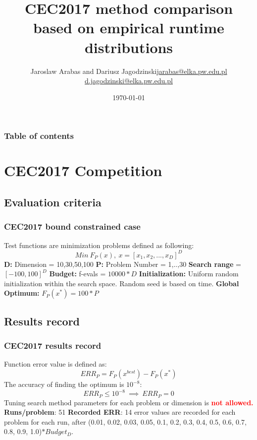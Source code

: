 \documentclass[hyperref={pdfpagelabels=false}]{beamer}
\title{CEC2017 method comparison based on empirical runtime distributions}
\author{Jaroslaw Arabas and Dariusz Jagodzinski\newline\url{jarabas@elka.pw.edu.pl}\newline
\url{d.jagodzinski@elka.pw.edu.pl}}
\date{\today}
\begin{document}
\begin{frame}
\titlepage
\end{frame} 


\begin{frame}
\frametitle{Table of contents}
\tableofcontents
\end{frame} 


\section{CEC2017 Competition} 
\subsection{Evaluation criteria}
\begin{frame}
\frametitle{CEC2017 bound constrained case} 
Test functions are minimization problems defined as following:
\begin{equation*}
  Min\ F_P(x),\ x=[x_1,x_2,...,x_D]^D
\end{equation*}
\textbf{D:} Dimension = {10,30,50,100}
\textbf{P:} Problem Number = {1,..,30}
\textbf{Search range} = $[-100,100]^D$
\textbf{Budget:} f-evals = $10000*D$
\textbf{Initialization:} Uniform random initialization within the search space. Random seed is based on time.
\newline \textbf{Global Optimum:} $F_P(x^*) =100*P $

%
    
\end{frame}

\subsection{Results record}
\begin{frame}
\frametitle{CEC2017 results record} 
Function error value is defined as:
\begin{equation*}
  ERR_P = F_P(x^{best})- F_P(x^*)
\end{equation*}
The accuracy of finding the optimum is $10^{-8}$:
\begin{equation*}
 ERR_P \leq 10^{-8} \ \implies \ ERR_P = 0
\end{equation*}
Tuning search method parameters for each problem or dimension is \textcolor{red}{\textbf{not allowed.}}
\newline \newline \textbf{Runs/problem}: 51
\newline \textbf{Recorded ERR}: 14 error values are recorded for each problem for each run, after (0.01, 0.02, 0.03, 0.05, 0.1, 0.2, 0.3, 0.4, 0.5, 0.6, 0.7, 0.8, 0.9, 1.0)$*Budget_D$.
\end{frame}
\end{document}
